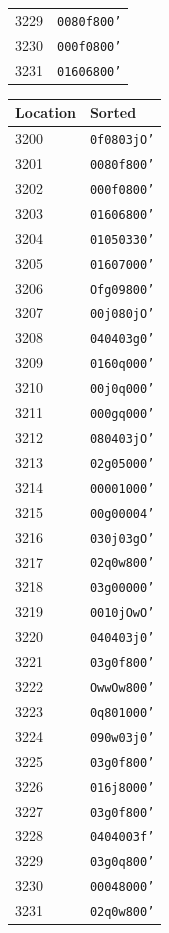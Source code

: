 \begin{table}[h!]
\begin{minipage}{0.48\textwidth}
\begin{tabular}{ll}
3229 & \texttt{0080f800'} \\
3230 & \texttt{000f0800'} \\
3231 & \texttt{01606800'} \\
\bottomrule
\end{tabular}
\end{minipage}
\hfill
\begin{minipage}{0.48\textwidth}
\centering
\begin{tabular}{ll}
\toprule
\textbf{Location} & \textbf{Sorted} \\
\midrule
3200 & \texttt{0f0803jO'} \\
3201 & \texttt{0080f800'} \\
3202 & \texttt{000f0800'} \\
3203 & \texttt{01606800'} \\
\midrule
3204 & \texttt{01050330'} \\
3205 & \texttt{01607000'} \\
3206 & \texttt{Ofg09800'} \\
3207 & \texttt{00j080jO'} \\
\midrule
3208 & \texttt{040403g0'} \\
3209 & \texttt{0160q000'} \\
3210 & \texttt{00j0q000'} \\
3211 & \texttt{000gq000'} \\
\midrule
3212 & \texttt{080403jO'} \\
3213 & \texttt{02g05000'} \\
3214 & \texttt{00001000'} \\
3215 & \texttt{00g00004'} \\
\midrule
3216 & \texttt{030j03gO'} \\
3217 & \texttt{02q0w800'} \\
3218 & \texttt{03g00000'} \\
3219 & \texttt{0010jOwO'} \\
\midrule
3220 & \texttt{040403j0'} \\
3221 & \texttt{03g0f800'} \\
3222 & \texttt{OwwOw800'} \\
3223 & \texttt{0q801000'} \\
\midrule
3224 & \texttt{090w03j0'} \\
3225 & \texttt{03g0f800'} \\
3226 & \texttt{016j8000'} \\
3227 & \texttt{03g0f800'} \\
\midrule
3228 & \texttt{0404003f'} \\
3229 & \texttt{03g0q800'} \\
3230 & \texttt{00048000'} \\
3231 & \texttt{02q0w800'} \\
\bottomrule
\end{tabular}
\end{minipage}
\end{table}

